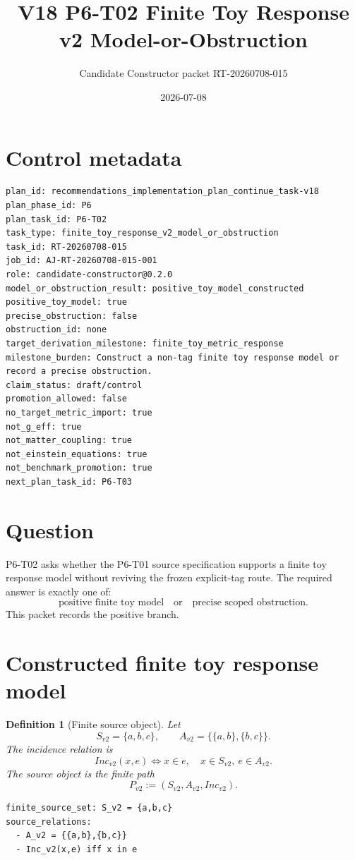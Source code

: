 \documentclass[11pt]{article}
\title{V18 P6-T02 Finite Toy Response v2 Model-or-Obstruction}
\author{Candidate Constructor packet RT-20260708-015}
\date{2026-07-08}
\newtheorem{definition}{Definition}
\begin{document}
\maketitle

\section*{Control metadata}

\begin{verbatim}
plan_id: recommendations_implementation_plan_continue_task-v18
plan_phase_id: P6
plan_task_id: P6-T02
task_type: finite_toy_response_v2_model_or_obstruction
task_id: RT-20260708-015
job_id: AJ-RT-20260708-015-001
role: candidate-constructor@0.2.0
model_or_obstruction_result: positive_toy_model_constructed
positive_toy_model: true
precise_obstruction: false
obstruction_id: none
target_derivation_milestone: finite_toy_metric_response
milestone_burden: Construct a non-tag finite toy response model or record a precise obstruction.
claim_status: draft/control
promotion_allowed: false
no_target_metric_import: true
not_g_eff: true
not_matter_coupling: true
not_einstein_equations: true
not_benchmark_promotion: true
next_plan_task_id: P6-T03
\end{verbatim}

\section{Question}

P6-T02 asks whether the P6-T01 source specification supports a finite toy
response model without reviving the frozen explicit-tag route. The required
answer is exactly one of:
\[
  \text{positive finite toy model}
  \quad\text{or}\quad
  \text{precise scoped obstruction}.
\]
This packet records the positive branch.

\section{Constructed finite toy response model}

\begin{definition}[Finite source object]
Let
\[
  S_{v2}=\{a,b,c\},\qquad
  A_{v2}=\bigl\{\{a,b\},\{b,c\}\bigr\}.
\]
The incidence relation is
\[
  Inc_{v2}(x,e) \iff x\in e,\quad x\in S_{v2},\ e\in A_{v2}.
\]
The source object is the finite path
\[
  P_{v2}:=(S_{v2},A_{v2},Inc_{v2}).
\]
\end{definition}

\begin{verbatim}
finite_source_set: S_v2 = {a,b,c}
source_relations:
  - A_v2 = {{a,b},{b,c}}
  - Inc_v2(x,e) iff x in e
\end{verbatim}
\end{document}

